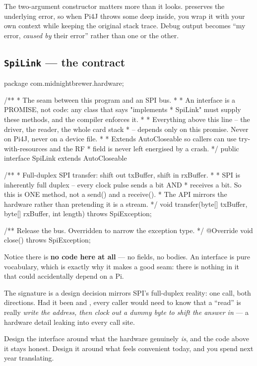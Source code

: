 The two-argument constructor matters more than it looks.  preserves the underlying error, so when Pi4J throws some
 deep inside, you wrap it with your own context while keeping
the original stack trace. Debug output becomes ``my error, \emph{caused by}
their error'' rather than one or the other.

\subsection{\texttt{SpiLink} --- the contract}

\begin{jcode}
package com.midnightbrewer.hardware;

/**
 * The seam between this program and an SPI bus.
 *
 * An interface is a PROMISE, not code: any class that says "implements
 * SpiLink" must supply these methods, and the compiler enforces it.
 *
 * Everything above this line -- the driver, the reader, the whole card stack
 * -- depends only on this promise. Never on Pi4J, never on a device file.
 *
 * Extends AutoCloseable so callers can use try-with-resources and the RF
 * field is never left energised by a crash.
 */
public interface SpiLink extends AutoCloseable {

    /**
     * Full-duplex SPI transfer: shift out txBuffer, shift in rxBuffer.
     *
     * SPI is inherently full duplex -- every clock pulse sends a bit AND
     * receives a bit. So this is ONE method, not a send() and a receive().
     * The API mirrors the hardware rather than pretending it is a stream.
     */
    void transfer(byte[] txBuffer, byte[] rxBuffer, int length) throws SpiException;

    /** Release the bus. Overridden to narrow the exception type. */
    @Override
    void close() throws SpiException;
}
\end{jcode}

Notice there is \textbf{no code here at all} --- no fields, no bodies. An
interface is pure vocabulary, which is exactly why it makes a good seam: there
is nothing in it that could accidentally depend on a Pi.

\begin{deeper}{The signature is a design decision}
 mirrors SPI's full-duplex reality: one call,
both directions. Had it been  and , every caller
would need to know that a ``read'' is really \emph{write the address, then clock
out a dummy byte to shift the answer in} --- a hardware detail leaking into every
call site.

Design the interface around what the hardware genuinely \emph{is}, and the code
above it stays honest. Design it around what feels convenient today, and you
spend next year translating.
\end{deeper}


